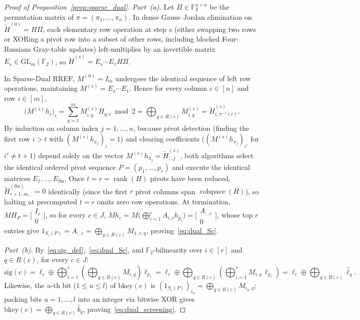 \documentclass[12pt]{article}
\theoremstyle{definition}
\newcommand{\Ftwo}{\mathbb{F}_2}
\DeclareMathOperator{\rank}{rank}
\begin{document}
\begin{proof}[Proof of Proposition~\ref{prop:sparse_dual}]
\emph{Part~(a).} Let $\Pi \in \Ftwo^{n \times n}$ be the permutation matrix of $\pi = (\pi_1, \dots, \pi_n)$. In
dense Gauss--Jordan elimination on $\widetilde{H}^{(0)} = H \Pi$, each elementary row operation at step $s$ (either
swapping two rows or XORing a pivot row into a subset of other rows, including blocked Four-Russians Gray-table
updates) left-multiplies by an invertible matrix $E_s \in \mathrm{GL}_m(\Ftwo)$, so $\widetilde{H}^{(s)} = E_s
\cdots E_1 H \Pi$.

In Sparse-Dual RREF, $M^{(0)} = I_m$ undergoes the identical sequence of left row operations, maintaining $M^{(s)} =
E_s \cdots E_1$. Hence for every column $c \in [n]$ and row $i \in [m]$,
\[
  \bigl(M^{(s)} h_c\bigr)_i = \sum_{q=1}^m M^{(s)}_{i, q} H_{q, c} \bmod 2 = \bigoplus_{q \in R(c)} M^{(s)}_{i, q}
  = \widetilde{H}^{(s)}_{i, \pi^{-1}(c)}.
\]
By induction on column index $j = 1, \dots, n$, because pivot detection (finding the first row $i > t$ with
$(M^{(s)} h_{\pi_j})_i = 1$) and clearing coefficients ($(M^{(s)} h_{\pi_j})_{i'}$ for $i' \neq t+1$) depend solely
on the vector $M^{(s)} h_{\pi_j} = \widetilde{H}^{(s)}_{:, j}$, both algorithms select the identical ordered pivot
sequence $P = (p_1, \dots, p_r)$ and execute the identical matrices $E_1, \dots, E_{\mathrm{fin}}$. Once $t = r =
\rank(H)$ pivots have been reduced, $\widetilde{H}^{(\mathrm{fin})}_{r+1..m, :} = 0$ identically (since the first
$r$ pivot columns span $\operatorname{colspace}(H)$), so halting at precomputed $t = r$ omits zero row operations.
At termination, $M H_P = \bigl[\begin{smallmatrix} I_r \\ 0 \end{smallmatrix}\bigr]$, so for every $c \in J$, $M
h_c = M \bigl(\bigoplus_{i=1}^r A_{i, c} h_{p_i}\bigr) = \bigl[\begin{smallmatrix} A_{:, c} \\ 0
\end{smallmatrix}\bigr]$, whose top $r$ entries give $1_{S_c(P)} = A_{:, c} = \bigoplus_{q \in R(c)} M_{1..r, q}$,
proving~\eqref{eq:dual_Sc}.

\emph{Part~(b).} By~\eqref{eq:sig_def},~\eqref{eq:dual_Sc}, and $\Ftwo$-bilinearity over $i \in [r]$ and $q \in
R(c)$, for every $c \in J$:
\[
  \mathrm{sig}(c)
  = \ell_c \oplus \bigoplus_{i=1}^r \left(\bigoplus_{q \in R(c)} M_{i, q}\right) \ell_{p_i}
  = \ell_c \oplus \bigoplus_{q \in R(c)} \left(\bigoplus_{i=1}^r M_{i, q}\,\ell_{p_i}\right)
  = \ell_c \oplus \bigoplus_{q \in R(c)} \hat{\ell}_q.
\]
Likewise, the $u$-th bit ($1 \le u \le l$) of $\mathrm{bkey}(c)$ is $(1_{S_c(P)})_{i_u} = \bigoplus_{q \in R(c)}
M_{i_u, q}$; packing bits $u = 1, \dots, l$ into an integer via bitwise XOR gives $\mathrm{bkey}(c) = \bigoplus_{q
\in R(c)} \hat{b}_q$, proving~\eqref{eq:dual_screening}.
\end{proof}
\end{document}
